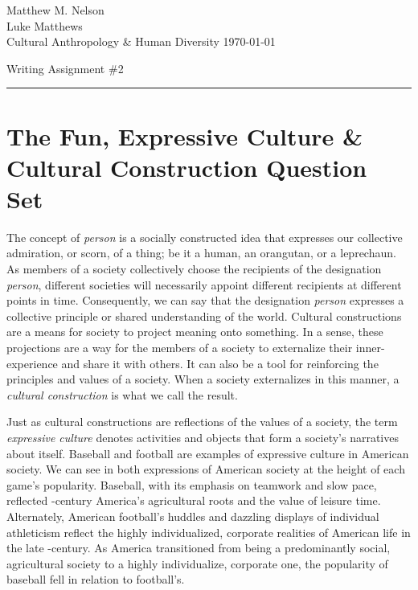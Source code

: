 \documentclass[12pt]{article}
\begin{document}
\begin{flushright}
\singlespacing
Matthew M. Nelson\\
Luke Matthews\\
Cultural Anthropology \& Human Diversity
\today\\
\end{flushright}
\doublespacing

\begin{center}
Writing Assignment \#2
\end{center}

\begin{flushleft}
\setlength{\parindent}{0.5in}


\noindent\rule{\textwidth}{0.5pt}
\section{The Fun, Expressive Culture \& Cultural Construction Question Set}

The concept of \emph{person} is a socially constructed idea that expresses our
collective admiration, or scorn, of a thing; be it a human, an orangutan, or a
leprechaun. As members of a society collectively choose the recipients of the
designation \emph{person}, different societies will necessarily appoint different
recipients at different points in time. Consequently, we can say that the
designation \emph{person} expresses a collective principle or shared understanding of
the world. Cultural constructions are a means for society to project meaning
onto something. In a sense, these projections are a way for the members of a
society to externalize their inner-experience and share it with others. It can
also be a tool for reinforcing the principles and values of a society. When a
society externalizes in this manner, a \emph{cultural construction} is what we call the
result.

Just as cultural constructions are reflections of the values of a society, the
term \emph{expressive culture} denotes activities and objects that form a society's
narratives about itself. Baseball and football are examples of expressive
culture in American society. We can see in both expressions of American society
at the height of each game's popularity. Baseball, with its emphasis on teamwork
and slow pace, reflected -century America's agricultural roots and the
value of leisure time. Alternately, American football's huddles and dazzling
displays of individual athleticism reflect the highly individualized, corporate
realities of American life in the late -century. As America transitioned
from being a predominantly social, agricultural society to a highly
individualize, corporate one, the popularity of baseball fell in relation to
football's.


\end{flushleft}
\end{document}
